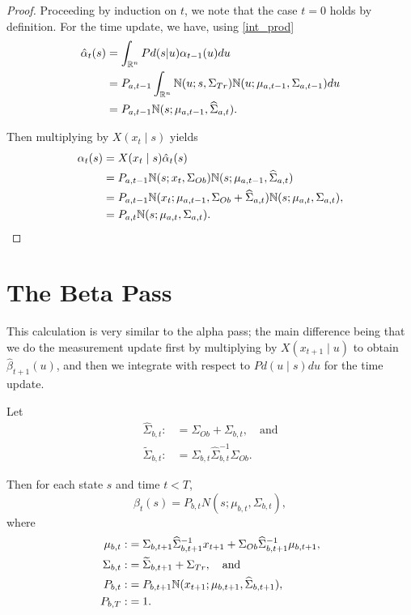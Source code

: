 \documentclass[12pt,leqno]{article}
\begin{document}
\begin{proof}

Proceeding by induction on $t$, we note that the case $t = 0$ holds by definition.
For the time update, we have, using \eqref{int_prod}
\begin{align}
  \hat{\alpha}_t(s) &= \int_{{\mathbb R}^n}Pd(s|u)\alpha_{t-1}(u)du \\\notag
 &= P_{a,t-1}\int_{{\mathbb R}^n}{\mathbb N}(u;s,\Sigma_{Tr}){\mathbb N}(u;\mu_{a,t-1},\Sigma_{a,t-1})du \notag\\
 &= P_{a,t-1}{\mathbb N}(s;\mu_{a,t-1},\widehat{\Sigma}_{a,t}).
\end{align}

Then multiplying by $X(x_t\mid s)$ yields
\begin{align*}
  \alpha_t(s) &= X(x_t\mid s)\hat{\alpha}_t(s) \\
  &= P_{a,t-1}{\mathbb N}(s;x_t,\Sigma_{Ob}){\mathbb N}(s;\mu_{a,t-1},\widehat{\Sigma}_{a,t}) \\
  &= P_{a,t-1}{\mathbb N}(x_t;\mu_{a,t-1},\Sigma_{Ob} + \widehat{\Sigma}_{a,t}){\mathbb N}(s;\mu_{a,t},\Sigma_{a,t}), \\
  &= P_{a,t}{\mathbb N}(s;\mu_{a,t},\Sigma_{a,t}).
\end{align*}
\end{proof}

\section{The Beta Pass}
This calculation is very similar to the alpha pass; the main difference being that we do
the measurement update first by multiplying by $X(x_{t+1}\mid u)$ to obtain $\hat{\beta}_{t+1}(u)$,
and then we integrate with respect to $Pd(u\mid s)du$ for the time update.  

\begin{Thm}\label{beta:1}
  Let 
\begin{align*}
  \widehat{\Sigma}_{b,t} :&= \Sigma_{Ob}+\Sigma_{b,t},\quad\text{and}\\
    \widetilde{\Sigma}_{b,t} :&= \Sigma_{b,t}\widehat{\Sigma}_{b,t}^{-1}\Sigma_{Ob}.
\end{align*}

  Then for each state $s$ and time $t < T$,
$$
  \beta_t(s) = P_{b,t}N(s;\mu_{b,t},\Sigma_{b,t}),
$$
where
\begin{align*}
  \mu_{b,t} :&= \Sigma_{b,t+1}\widehat{\Sigma}_{b,t+1}^{-1}x_{t+1} + \Sigma_{Ob}\widehat{\Sigma}_{b,t+1}^{-1}\mu_{b,t+1},\\
  \Sigma_{b,t} :&= \widetilde{\Sigma}_{b,t+1} + \Sigma_{Tr},\quad\text{and}\\
  P_{b,t}:&=P_{b,t+1}{\mathbb N}(x_{t+1};\mu_{b,t+1},\widehat{\Sigma}_{b,t+1}),\\
  P_{b,T} :&= 1.
\end{align*}
\end{Thm}
\end{document}

